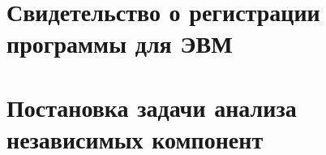 \appendix
\setlength{\midchapskip}{20pt}
\renewcommand*{\afterchapternum}{\par\nobreak\vskip \midchapskip}
\renewcommand\thechapter{\Asbuk{chapter}} %


\chapter{Свидетельство о регистрации программы для ЭВМ} \label{appendix:programm_registration}
\begin{figure}[ht]
\end{figure}


\chapter{Постановка задачи анализа независимых компонент} \label{appendix:ica_description}


